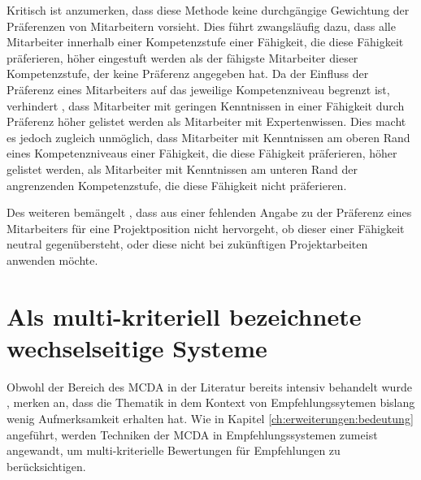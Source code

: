 Kritisch ist anzumerken, dass diese Methode keine durchgängige Gewichtung der Präferenzen von Mitarbeitern vorsieht.
Dies führt zwangsläufig dazu, dass alle Mitarbeiter innerhalb einer Kompetenzstufe einer Fähigkeit, die diese Fähigkeit präferieren, höher eingestuft werden als der fähigste Mitarbeiter dieser Kompetenzstufe, der keine Präferenz angegeben hat.
Da der Einfluss der Präferenz eines Mitarbeiters auf das jeweilige Kompetenzniveau begrenzt ist, verhindert \textcite[S. 1ff.]{link:booklet}, dass Mitarbeiter mit geringen Kenntnissen in einer Fähigkeit durch Präferenz höher gelistet werden als Mitarbeiter mit Expertenwissen.
Dies macht es jedoch zugleich unmöglich, dass Mitarbeiter mit Kenntnissen am oberen Rand eines Kompetenzniveaus einer Fähigkeit, die diese Fähigkeit präferieren, höher gelistet werden, als Mitarbeiter mit Kenntnissen am unteren Rand der angrenzenden Kompetenzstufe, die diese Fähigkeit nicht präferieren.

Des weiteren bemängelt \textcite[S. 69]{link:booklet}, dass aus einer fehlenden Angabe zu der Präferenz eines Mitarbeiters für eine Projektposition nicht hervorgeht, ob dieser einer Fähigkeit neutral gegenübersteht, oder diese nicht bei zukünftigen Projektarbeiten anwenden möchte.


\section{Als multi-kriteriell bezeichnete wechselseitige Systeme}
Obwohl der Bereich des \ac{MCDA} in der Literatur bereits intensiv behandelt wurde \cite[S. 220]{lakiotaki:inproceedings}, merken \textcite[S. 248]{kim:2:inproceedings} an, dass die Thematik in dem Kontext von Empfehlungssytemen bislang wenig Aufmerksamkeit erhalten hat.
Wie in Kapitel \ref{ch:erweiterungen:bedeutung} angeführt, werden Techniken der \ac{MCDA} in Empfehlungssystemen zumeist angewandt, um multi-kriterielle Bewertungen für Empfehlungen zu berücksichtigen.

